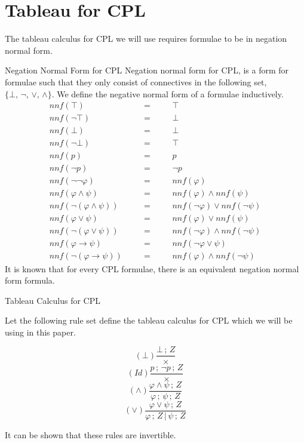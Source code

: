 \documentclass{llncs}
\newcommand{\nnf}{{nnf}}
\begin{document}
\section{Tableau for CPL}\label{Tableau for CPL}
%
The tableau calculus for CPL we will use requires formulae to be in negation
normal form.
%
\begin{definition}{Negation Normal Form for CPL}\label{NNF for CPL}
Negation normal form for CPL, is a form for formulae such that they only
consist of connectives in the following set, $\{\bot, \, \neg, \, \vee,\,
\wedge\}$. We define the negative normal form of a formulae inductively.
%
$$
\begin{array}{rlcll}
\nnf(\top)&\quad&=&\quad&\top \\
\nnf(\neg\top)&&=&&\bot \\
\nnf(\bot)&\quad&=&\quad&\bot \\
\nnf(\neg\bot)&&=&&\top \\
\nnf(p)&&=&&p \\
\nnf(\neg p)&&=&&\neg p \\
\nnf(\neg\neg\varphi)&&=&&\nnf(\varphi) \\
\nnf(\varphi \wedge \psi)&&=&&\nnf(\varphi) \wedge \nnf(\psi) \\
\nnf(\neg(\varphi \wedge \psi))&&=&&\nnf(\neg\varphi) \vee \nnf(\neg\psi) \\
\nnf(\varphi \vee \psi)&&=&&\nnf(\varphi) \vee \nnf(\psi) \\
\nnf(\neg(\varphi \vee \psi))&&=&&\nnf(\neg\varphi) \wedge \nnf(\neg\psi) \\
\nnf(\varphi \rightarrow \psi)&&=&&\nnf(\neg\varphi \vee \psi) \\
\nnf(\neg(\varphi \rightarrow \psi))&&=&&\nnf(\varphi) \wedge \nnf(\neg\psi)
\end{array}
$$
%
It is known that for every CPL formulae, there is an equivalent negation normal
form formula.
\end{definition}
\begin{definition}{Tableau Calculus for CPL}\label{Tableau Calculus for CPL}

Let the following rule set define the tableau calculus for CPL which we will be
using in this paper.
%
\begin{multicols}{4}
\noindent
\begin{equation*}
(\bot)\frac{\bot\,;\,Z}{\times}
\end{equation*}
\begin{equation*}
(Id)\frac{p\,;\,\neg p\,;\,Z}{\times}
\end{equation*}
\begin{equation*}
(\wedge)\frac{\varphi \wedge \psi\,;\,Z}{\varphi\,;\,\psi\,;\,Z}
\end{equation*}
\begin{equation*}
(\vee)\frac{\varphi \vee \psi\,;\,Z}{\varphi\,;\,Z\,|\,\psi\,;\,Z}
\end{equation*}
\end{multicols}
%
It can be shown that these rules are invertible.
\end{definition}
%
\end{document}
